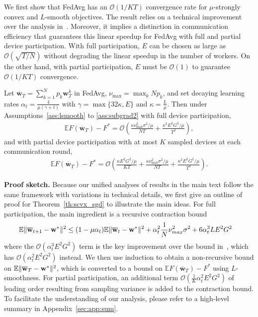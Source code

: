 We first show that FedAvg has an $\mathcal{O}(1/KT)$ convergence rate
for $\mu$-strongly convex and $L$-smooth objectives. The result relies on a technical improvement over the analysis in~\cite{li2019convergence}. Moreover, it
implies a distinction in communication efficiency that guarantees
this linear speedup for FedAvg with full and partial device participation.
With full participation, $E$ can be chosen as large as $\mathcal{O}(\sqrt{T/N})$
without degrading the linear speedup in the number of workers. On
the other hand, with partial participation, $E$ must be $\mathcal{O}(1)$
to guarantee $\mathcal{O}(1/KT)$ convergence.
\begin{theorem}
	\label{thm:SGD_scvx}Let $\overline{\mathbf{w}}_{T}=\sum_{k=1}^{N}p_{k}\mathbf{w}_{T}^{k}$ in FedAvg,
	$\nu_{\max}=\max_{k}Np_{k}$, and set decaying learning rates $\alpha_{t}=\frac{4}{\mu(\gamma+t)}$
	with $\gamma=\max\{32\kappa,E\}$ and $\kappa=\frac{L}{\mu}$. Then
	under Assumptions~\ref{ass:lsmooth} to \ref{ass:subgrad2} with full device participation, 
	\begin{align*}
	\mathbb{E}F(\overline{\mathbf{w}}_{T})-F^{\ast}=\mathcal{O}\left(\frac{\kappa\nu_{\max}^{2}\sigma^{2}/\mu}{NT}+\frac{\kappa^{2}E^{2}G^{2}/\mu}{T^{2}}\right),
	\end{align*}
	and with partial device participation with at most $K$ sampled devices
	at each communication round, 
	\begin{align*}
	\mathbb{E}F(\overline{\mathbf{w}}_{T})-F^{\ast}=\mathcal{O}\left(\frac{\kappa E^{2}G^{2}/\mu}{KT}+\frac{\kappa\nu_{\max}^{2}\sigma^{2}/\mu}{NT}+\frac{\kappa^{2}E^{2}G^{2}/\mu}{T^{2}}\right).
	\end{align*}
	\label{th:scvx_sgd}
\end{theorem}
\textbf{Proof sketch.} Because our unified analyses of results in the main text follow the same framework with variations in technical details, we first give an outline of proof  for Theorem~\ref{th:scvx_sgd} to illustrate the main ideas. For full participation, the main ingredient is a recursive contraction bound 
	\begin{align*}
	\mathbb{E}\|{\overline{\mathbf{w}}}_{t+1}-{\mathbf{w}}^{\ast}\|^{2} &  \leq(1-\mu\alpha_{t})\mathbb{E}\|{\overline{\mathbf{w}}}_{t}-{\mathbf{w}}^{\ast}\|^{2}+\alpha_{t}^{2}\frac{1}{N}\nu_{max}^{2}\sigma^{2}+6\alpha_{t}^{3}LE^{2}G^{2}
	\end{align*}
 where the $\mathcal{O}(\alpha_{t}^{3}E^{2}G^{2})$ term is the key improvement over the bound in~\cite{li2019convergence}, which has $\mathcal{O}(\alpha_{t}^{2}E^2 G^2)$ instead. We then use induction to obtain a non-recursive bound on $\mathbb{E}\|{\overline{\mathbf{w}}}_{T}-{\mathbf{w}}^{\ast}\|^{2}$, which is converted to a bound on $\mathbb{E}F(\overline{\mathbf{w}}_{T})-F^{\ast}$ using $L$-smoothness. For partial participation, an additional term $\mathcal{O}(\frac{1}{K} \alpha_t^2 E^2G^2)$ of leading order resulting from sampling variance is added to the contraction bound. To facilitate the understanding of our analysis, please refer to a high-level summary in Appendix~\ref{sec:app:sum}.

